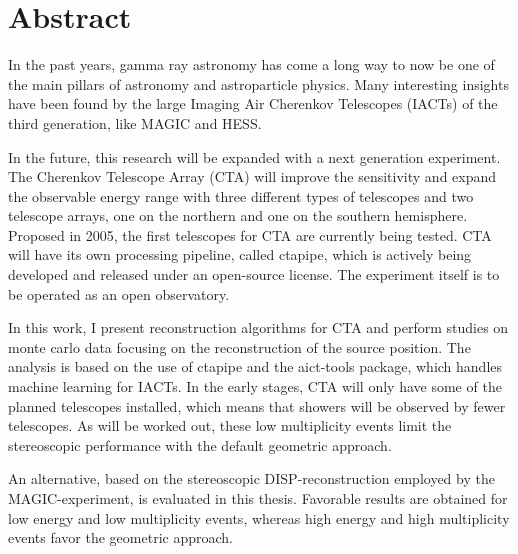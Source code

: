 \thispagestyle{plain}

\section*{Abstract}
In the past years, gamma ray astronomy has come a long way
to now be one of the main pillars of astronomy and astroparticle physics.
Many interesting insights have been found by the large Imaging Air Cherenkov Telescopes (IACTs) 
of the third generation, like MAGIC and HESS.

In the future, this research will be expanded with a next generation experiment.
The Cherenkov Telescope Array (CTA) will improve the sensitivity and
expand the observable energy range with 
three different types of telescopes and two telescope arrays, one on the northern and 
one on the southern hemisphere.
Proposed in 2005, the first telescopes for CTA are currently being tested.
CTA will have its own processing pipeline, called ctapipe, which is
actively being developed and released under an open-source license.
The experiment itself is to be operated as an open observatory.

In this work, I present reconstruction algorithms for CTA and perform 
studies on monte carlo data focusing on the reconstruction of the source position.
The analysis is based on the use of ctapipe and the
aict-tools package, which handles machine learning for IACTs.
In the early stages, CTA will only have some of the planned telescopes installed,
which means that showers will be observed by fewer telescopes.
As will be worked out, these low multiplicity events limit the stereoscopic
performance with the default geometric approach.

An alternative, based on the stereoscopic DISP-reconstruction employed by
the MAGIC-experiment, is evaluated in this thesis.
Favorable results are obtained for low energy and low multiplicity
events, whereas
high energy and high multiplicity events favor the geometric approach.
